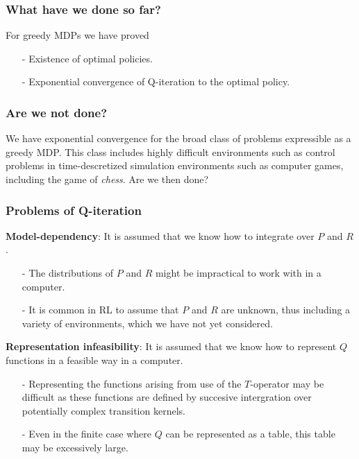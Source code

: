 \documentclass{beamer}[10]
\begin{document}

\begin{frame}
  \frametitle{What have we done so far?}
  For greedy MDPs we have proved
  \begin{itemize}
    \item[-] Existence of optimal policies.
    \item[-] Exponential convergence of Q-iteration to the optimal
      policy.
  \end{itemize}
\end{frame}

\begin{frame}
  \frametitle{Are we not done?}
  We have exponential convergence for the broad class of problems expressible
  as a greedy MDP. This class includes highly difficult environments such as
  control problems in time-descretized simulation environments such as computer
  games, including the game of \emph{chess}. Are we then done?
\end{frame}

\begin{frame}
  \frametitle{Problems of Q-iteration}
  \begingroup
  \footnotesize
  \textbf{Model-dependency}:
  It is assumed that we know how to integrate over $P$ and $R$.
  \begin{itemize}
    \item[-] The distributions of $P$ and $R$ might be impractical to
      work with in a computer.
    \item[-] It is common in RL to assume that $P$ and $R$ are unknown,
      thus including a variety of environments, which we have not yet
      considered.
  \end{itemize}
  \textbf{Representation infeasibility}:
  It is assumed that we know how to represent $Q$ functions in 
  a feasible way in a computer.
  \begin{itemize}
    \item[-] Representing the functions arising from use of the $T$-operator
      may be difficult as these functions are defined by succesive 
      intergration over potentially complex transition kernels.
    \item[-] Even in the finite case where $Q$ can be represented as a table,
      this table may be excessively large.
  \end{itemize}
  \endgroup
\end{frame}
\end{document}
